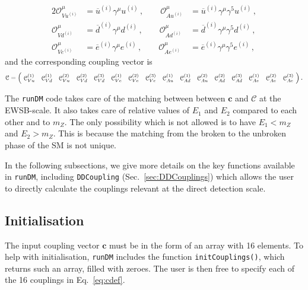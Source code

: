 \documentclass[notitlepage,12pt]{article}
\newcommand{\runDM}{\texttt{runDM}\xspace}
\newcommand\scalemath[2]{\scalebox{#1}{\mbox{\ensuremath{\displaystyle #2}}}}
\begin{document}
\begin{alignat}{2}
\mathcal{O}_{Vu^{(i)}}^\mu &= \overline{u}^{(i)} \gamma^\mu u^{(i)}\,, \qquad \mathcal{O}_{Au^{(i)}}^\mu &= \overline{u}^{(i)} \gamma^\mu \gamma^5 u^{(i)}\,, \nonumber \\
\mathcal{O}_{Vd^{(i)}}^\mu &= \overline{d}^{(i)} \gamma^\mu d^{(i)}\,, \qquad \mathcal{O}_{Ad^{(i)}}^\mu &=  \overline{d}^{(i)} \gamma^\mu \gamma^5 d^{(i)}\,,\\
\mathcal{O}_{Ve^{(i)}}^\mu &= \overline{e}^{(i)} \gamma^\mu e^{(i)}\,, \qquad \mathcal{O}_{Ae^{(i)}}^\mu &=  \overline{e}^{(i)} \gamma^\mu \gamma^5 e^{(i)}\,, \nonumber
\end{alignat}
and the corresponding coupling vector is
\begin{align}
\scalemath{0.9}{\mathcal{C} = \left(\!\begin{array}{cccccccccccccccc}
\mathcal{C}_{ Vu}^{(1)} & \mathcal{C}_{ Vd}^{(1)} & \mathcal{C}_{ Vu}^{(2)} & \mathcal{C}_{ Vd}^{(2)} & \mathcal{C}_{ Vd}^{(3)} & 
\mathcal{C}_{ Ve}^{(1)} &\mathcal{C}_{ Ve}^{(2)}  & \mathcal{C}_{ Ve}^{(3)}  & \mathcal{C}_{ Au}^{(1)} & \mathcal{C}_{ Ad}^{(1)} & \mathcal{C}_{ Au}^{(2)} & \mathcal{C}_{ Ad}^{(2)} & \mathcal{C}_{ Ad}^{(3)} & 
\mathcal{C}_{ Ae}^{(1)} &\mathcal{C}_{ Ae}^{(2)}  & \mathcal{C}_{ Ae}^{(3)} \end{array}\!\right) }\,.
\label{eq:cdef2}
\end{align}

The \runDM code takes care of the matching between between $\mathbf{c}$ and $\mathcal{C}$ at the EWSB-scale. It also takes care of relative values of $E_1$ and $E_2$ compared to each other and to $m_Z$. The only possibility which is not allowed is to have $E_1 < m_Z$ and $E_2 > m_Z$. This is because the matching from the broken to the unbroken phase of the SM is not unique.

In the following subsections, we give more details on the key functions available in \runDM, including \texttt{DDCoupling} (Sec.~\ref{sec:DDCouplings}) which allows the user to directly calculate the couplings relevant at the direct detection scale.

\subsection{Initialisation}
\label{sec:init}

The input coupling vector $\mathbf{c}$ must be in the form of an array with 16 elements. To help with initialisation, \runDM includes the function \texttt{initCouplings()}, which returns such an array, filled with zeroes. The user is then free to specify each of the 16 couplings in Eq.~\ref{eq:cdef}.
\end{document}
